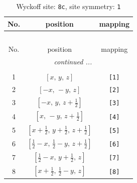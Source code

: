 \documentclass[fleqn,8pt]{jsarticle}
\begin{document}
\renewcommand{\arraystretch}{1.2}
\begin{longtable}{ccc}
\caption{Wyckoff site: {\tt 8c}, site symmetry: {\tt 1}}
 \\
 \hline \hline
No. & position & mapping \\ \hline \endfirsthead

\multicolumn{2}{l}{\tablename\ \thetable{}} \\
 \hline \hline
No. & position & mapping \\ \hline \endhead

 \hline \hline
\multicolumn{2}{r}{\footnotesize\it continued ...} \\ \endfoot

 \hline \hline
\multicolumn{2}{r}{} \\ \endlastfoot

1 & $\left[ x,\, y,\, z \right]$ & {\tt [1]} \\ \hline
2 & $\left[ - x,\, - y,\, z \right]$ & {\tt [2]} \\ \hline
3 & $\left[ - x,\, y,\, z + \frac{1}{2} \right]$ & {\tt [3]} \\ \hline
4 & $\left[ x,\, - y,\, z + \frac{1}{2} \right]$ & {\tt [4]} \\ \hline
5 & $\left[ x + \frac{1}{2},\, y + \frac{1}{2},\, z + \frac{1}{2} \right]$ & {\tt [5]} \\ \hline
6 & $\left[ \frac{1}{2} - x,\, \frac{1}{2} - y,\, z + \frac{1}{2} \right]$ & {\tt [6]} \\ \hline
7 & $\left[ \frac{1}{2} - x,\, y + \frac{1}{2},\, z \right]$ & {\tt [7]} \\ \hline
8 & $\left[ x + \frac{1}{2},\, \frac{1}{2} - y,\, z \right]$ & {\tt [8]} \\
\end{longtable}
\end{document}
